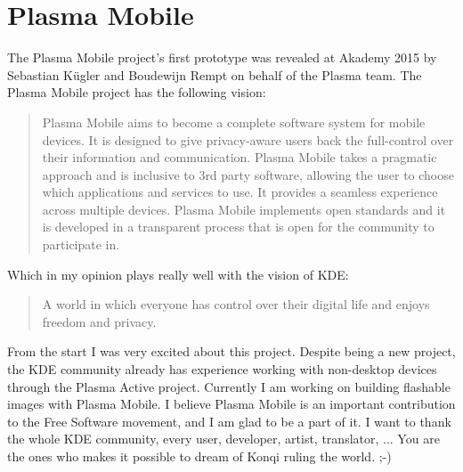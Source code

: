 \section*{Plasma Mobile} The Plasma Mobile project's first prototype was revealed at Akademy 2015 by Sebastian K\"{u}gler and Boudewijn Rempt on behalf of the Plasma team. The Plasma Mobile project has the following vision:

\begin{quote}
Plasma Mobile aims to become a complete software system for mobile devices. It is designed to give privacy-aware users back the full-control over their information and communication. Plasma Mobile takes a pragmatic approach and is inclusive to 3rd party software, allowing the user to choose which applications and services to use. It provides a seamless experience across multiple devices. Plasma Mobile implements open standards and it is developed in a transparent process that is open for the community to participate in.
\end{quote}

\noindent{}Which in my opinion plays really well with the vision of KDE:

\begin{quote}
A world in which everyone has control over their digital life and enjoys freedom and privacy.
\end{quote}

\noindent{}From the start I was very excited about this project. Despite being a new project, the KDE community already has experience working with non-desktop devices through the Plasma Active project. Currently I am working on building flashable images with Plasma Mobile. I believe Plasma Mobile is an important contribution to the Free Software movement, and I am glad to be a part of it.
\linebreak 
\linebreak
I want to thank the whole KDE community, every user, developer, artist, translator, ... You are the ones who makes it possible to dream of Konqi ruling the world. ;-)
